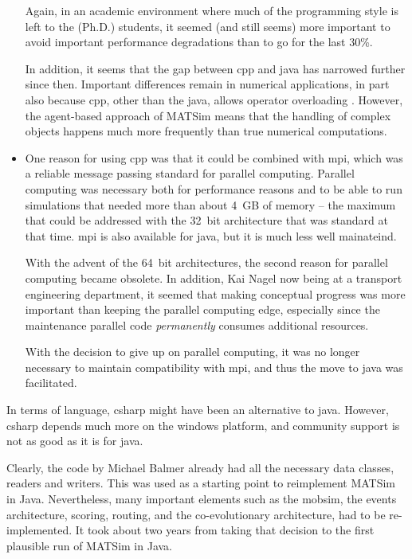 \begin{itemize}
Again, in an academic environment where much of the programming style is left to the (Ph.D.) students, it seemed (and still seems) more important to avoid important performance degradations than to go for the last 30\%.


In addition, it seems that the gap between \gls{cpp} and \gls{java} has narrowed further since then.  Important differences remain in numerical applications, in part also because \gls{cpp}, other than the \gls{java}, allows operator overloading \citep{..}.  However, the agent-based approach of MATSim means that the handling of complex objects happens much more frequently than true numerical computations.

\item One reason for using \gls{cpp} was that it could be combined with \acrshort{mpi}, which was a reliable message passing standard for parallel computing.  Parallel computing was necessary both for performance reasons and to be able to run simulations that needed more than about 4~GB of memory -- the maximum that could be addressed with the 32~bit architecture that was standard at that time.  \acrshort{mpi} is also available for \gls{java}, but it is much less well mainateind.

With the advent of the 64~bit architectures, the second reason for parallel computing became obsolete. In addition, Kai Nagel now being at a transport engineering department, it seemed that making conceptual progress was more important than keeping the parallel computing edge, especially since the maintenance parallel code \emph{permanently} consumes additional resources.

With the decision to give up on parallel computing, it was no longer necessary to maintain compatibility with \acrshort{mpi}, and thus the move to \gls{java} was facilitated.

\end{itemize}
In terms of language, \gls{csharp} might have been an alternative to \gls{java}.  However, \gls{csharp} depends much more on the \gls{windows} platform, and community support is not as good as it is for \gls{java}.

Clearly, the code by Michael Balmer already had all the necessary data classes, readers and writers.  This was used as a starting point to reimplement MATSim in Java.  Nevertheless, many important elements such as the mobsim, the events architecture, scoring, routing, and the co-evolutionary architecture, had to be re-implemented.  It took about two years from taking that decision to the first plausible run of MATSim in Java.



